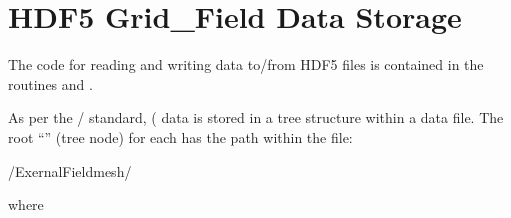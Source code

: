 {{{{{{{{%
\section{HDF5 Grid\_Field Data Storage}
\label{s:hdf5.grid}

The code for reading and writing  data to/from HDF5 files is contained in the
routines  and
.

As per the / standard,  ( data is
stored in a tree structure within a data file. The root ``'' (tree node) for each 
has the path within the file:
\begin{example}
  /ExernalFieldmesh/%
\end{example}
where \vn{%

}}}}}}}}}
